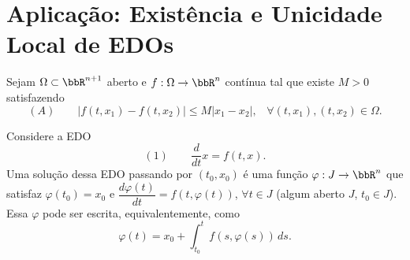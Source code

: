 \section{Aplicação: Existência e Unicidade Local de EDOs}

Sejam $\Omega\subset\bbR^{n+1}$ aberto e $f:\Omega\to\bbR^n$ contínua tal que existe $M>0$ satisfazendo
$$(A)\qquad |f(t,x_1)-f(t,x_2)|\leq M|x_1-x_2|\text{,}\quad \forall (t,x_1),(t,x_2)\in\Omega\text{.}$$

Considere a EDO
$$(1)\qquad \frac{d}{dt}x=f(t,x)\text{.}$$
Uma solução dessa EDO passando por $(t_0,x_0)$ é uma função $\varphi:J\to\bbR^n$ que satisfaz
$\varphi(t_0)=x_0$ e $\dfrac{d\varphi(t)}{dt}=f(t,\varphi(t))$, $\forall t\in J$ (algum aberto $J$,
$t_0\in J$). Essa $\varphi$ pode ser escrita, equivalentemente, como
$$\varphi(t)=x_0+\int_{t_0}^{t}f(s,\varphi(s))\,ds\text{.}$$

